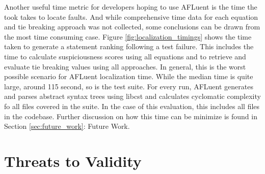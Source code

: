Another useful time metric for developers hoping to use AFLuent is the time the
took takes to locate faults. And while
comprehensive time data for each equation and tie breaking approach was not
collected, some conclusions can be drawn from the most time consuming case.
Figure \ref{fig:localization_timings} shows the time taken to generate a
statement ranking following a test failure. This includes the time to calculate
suspiciousness scores using all equations and to retrieve and evaluate tie
breaking values using all approaches. In general, this is the worst possible
scenario for AFLuent localization time. While the median time is quite large,
around 115 second, so is the test suite. For every run, AFLuent generates and parses
abstract syntax trees using libcst and calculates cyclomatic complexity fo all
files covered in the suite. In the case of this evaluation, this includes all
files in the codebase. Further discussion on how this time can be minimize is
found in Section \ref{sec:future_work}: Future Work.

\section{Threats to Validity}

